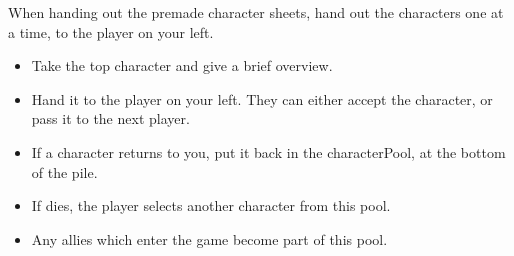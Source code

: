 When handing out the premade character sheets, hand out the characters one at a time, to the player on your left.

\begin{itemize}
  \item
  Take the top character and give a brief overview.
  \item
  Hand it to the player on your left.
  They can either accept the character, or pass it to the next player.
  \item
  If a character returns to you, put it back in the \gls{characterPool}, at the bottom of the pile.
  \item
  If  dies, the player selects another character from this pool.
  \item
  Any allies which enter the game become part of this pool.
\end{itemize}
